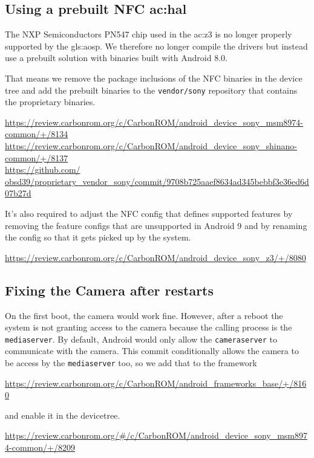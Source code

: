 \subsection{Using a prebuilt NFC \acrshort{ac:hal}}

The NXP Semiconductors PN547 chip used in the \acrshort{ac:z3} is no longer properly supported by the \gls{gls:aosp}.
We therefore no longer compile the drivers but instead use a prebuilt solution with binaries built with Android 8.0.

That means we remove the package inclusions of the NFC binaries in the device tree and add the prebuilt binaries to the \texttt{vendor/sony} repository that contains the proprietary binaries.

\url{https://review.carbonrom.org/c/CarbonROM/android_device_sony_msm8974-common/+/8134}\\
\url{https://review.carbonrom.org/c/CarbonROM/android_device_sony_shinano-common/+/8137}\\
\href{https://github.com/obsd39/proprietary_vendor_sony/commit/9708b725aaef8634ad345bebbf3e36ed6d07b27d}{https://github.com/\\obsd39/proprietary\_vendor\_sony/commit/9708b725aaef8634ad345bebbf3e36ed6d07b27d}

It's also required to adjust the NFC config that defines supported features by removing the feature configs that are unsupported in Android 9 and by renaming the config so that it gets picked up by the system.

\url{https://review.carbonrom.org/c/CarbonROM/android_device_sony_z3/+/8080}

\subsection{Fixing the Camera after restarts}
On the first boot, the camera would work fine. However, after a reboot the system is not granting access to the camera because the calling process is the \texttt{mediaserver}.
By default, Android would only allow the \texttt{cameraserver} to communicate with the camera. This commit conditionally allows the camera to be access by the \texttt{mediaserver} too, so we add that to the framework

\url{https://review.carbonrom.org/c/CarbonROM/android_frameworks_base/+/8160}

and enable it in the devicetree.

\url{https://review.carbonrom.org/#/c/CarbonROM/android_device_sony_msm8974-common/+/8209}


